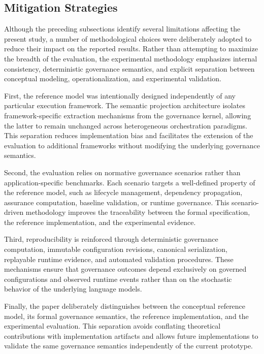 \documentclass[10pt]{article}
\begin{document}
\subsection{Mitigation Strategies}
\label{sec:mitigation_strategies}

Although the preceding subsections identify several limitations affecting the present study, a number of methodological choices were deliberately adopted to reduce their impact on the reported results. Rather than attempting to maximize the breadth of the evaluation, the experimental methodology emphasizes internal consistency, deterministic governance semantics, and explicit separation between conceptual modeling, operationalization, and experimental validation.

First, the reference model was intentionally designed independently of any particular execution framework. The semantic projection architecture isolates framework-specific extraction mechanisms from the governance kernel, allowing the latter to remain unchanged across heterogeneous orchestration paradigms. This separation reduces implementation bias and facilitates the extension of the evaluation to additional frameworks without modifying the underlying governance semantics.

Second, the evaluation relies on normative governance scenarios rather than application-specific benchmarks. Each scenario targets a well-defined property of the reference model, such as lifecycle management, dependency propagation, assurance computation, baseline validation, or runtime governance. This scenario-driven methodology improves the traceability between the formal specification, the reference implementation, and the experimental evidence.

Third, reproducibility is reinforced through deterministic governance computation, immutable configuration revisions, canonical serialization, replayable runtime evidence, and automated validation procedures. These mechanisms ensure that governance outcomes depend exclusively on governed configurations and observed runtime events rather than on the stochastic behavior of the underlying language models.

Finally, the paper deliberately distinguishes between the conceptual reference model, its formal governance semantics, the reference implementation, and the experimental evaluation. This separation avoids conflating theoretical contributions with implementation artifacts and allows future implementations to validate the same governance semantics independently of the current prototype.
\end{document}
